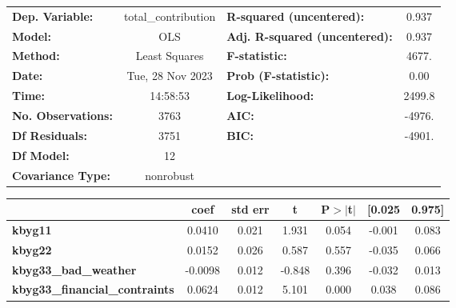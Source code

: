 \begin{center}
\begin{tabular}{lclc}
\toprule
\textbf{Dep. Variable:}                      & total\_contribution & \textbf{  R-squared (uncentered):}      &     0.937   \\
\textbf{Model:}                              &         OLS         & \textbf{  Adj. R-squared (uncentered):} &     0.937   \\
\textbf{Method:}                             &    Least Squares    & \textbf{  F-statistic:       }          &     4677.   \\
\textbf{Date:}                               &   Tue, 28 Nov 2023  & \textbf{  Prob (F-statistic):}          &     0.00    \\
\textbf{Time:}                               &       14:58:53      & \textbf{  Log-Likelihood:    }          &    2499.8   \\
\textbf{No. Observations:}                   &          3763       & \textbf{  AIC:               }          &    -4976.   \\
\textbf{Df Residuals:}                       &          3751       & \textbf{  BIC:               }          &    -4901.   \\
\textbf{Df Model:}                           &            12       & \textbf{                     }          &             \\
\textbf{Covariance Type:}                    &      nonrobust      & \textbf{                     }          &             \\
\bottomrule
\end{tabular}
\begin{tabular}{lcccccc}
                                             & \textbf{coef} & \textbf{std err} & \textbf{t} & \textbf{P$> |$t$|$} & \textbf{[0.025} & \textbf{0.975]}  \\
\midrule
\textbf{kbyg11}                              &       0.0410  &        0.021     &     1.931  &         0.054        &       -0.001    &        0.083     \\
\textbf{kbyg22}                              &       0.0152  &        0.026     &     0.587  &         0.557        &       -0.035    &        0.066     \\
\textbf{kbyg33\_bad\_weather}                &      -0.0098  &        0.012     &    -0.848  &         0.396        &       -0.032    &        0.013     \\
\textbf{kbyg33\_financial\_contraints}       &       0.0624  &        0.012     &     5.101  &         0.000        &        0.038    &        0.086     \\

\end{tabular}
\end{center}

